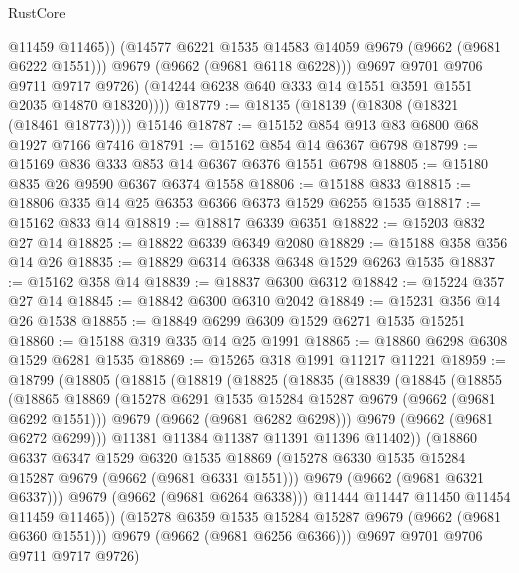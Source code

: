 \begin{lexlean}{RustCore}
\begin{coremodule}
                  @11459
                  @11465))
              (@14577 @6221 @1535 @14583 @14059 @9679 (@9662 (@9681 @6222 @1551)))
              @9679
              (@9662 (@9681 @6118 @6228)))
            @9697
            @9701
            @9706
            @9711
            @9717
            @9726)
          (@14244 @6238 @640 @333 @14 @1551 @3591 @1551 @2035 @14870 @18320))))
@18779 := @18135 (@18139 (@18308 (@18321 (@18461 @18773)))) @15146
@18787 := @15152 @854 @913 @83 @6800 @68 @1927 @7166 @7416
@18791 := @15162 @854 @14 @6367 @6798
@18799 := @15169 @836 @333 @853 @14 @6367 @6376 @1551 @6798
@18805 := @15180 @835 @26 @9590 @6367 @6374 @1558
@18806 := @15188 @833
@18815 := @18806 @335 @14 @25 @6353 @6366 @6373 @1529 @6255 @1535
@18817 := @15162 @833 @14
@18819 := @18817 @6339 @6351
@18822 := @15203 @832 @27 @14
@18825 := @18822 @6339 @6349 @2080
@18829 := @15188 @358 @356 @14 @26
@18835 := @18829 @6314 @6338 @6348 @1529 @6263 @1535
@18837 := @15162 @358 @14
@18839 := @18837 @6300 @6312
@18842 := @15224 @357 @27 @14
@18845 := @18842 @6300 @6310 @2042
@18849 := @15231 @356 @14 @26 @1538
@18855 := @18849 @6299 @6309 @1529 @6271 @1535 @15251
@18860 := @15188 @319 @335 @14 @25 @1991
@18865 := @18860 @6298 @6308 @1529 @6281 @1535
@18869 := @15265 @318 @1991 @11217 @11221
@18959 := @18799
    (@18805
      (@18815
        (@18819
          (@18825
            (@18835
              (@18839
                (@18845
                  (@18855
                    (@18865
                      @18869
                      (@15278 @6291 @1535 @15284 @15287 @9679 (@9662 (@9681 @6292 @1551)))
                      @9679
                      (@9662 (@9681 @6282 @6298)))
                    @9679
                    (@9662 (@9681 @6272 @6299)))
                  @11381
                  @11384
                  @11387
                  @11391
                  @11396
                  @11402))
              (@18860
                @6337
                @6347
                @1529
                @6320
                @1535
                @18869
                (@15278 @6330 @1535 @15284 @15287 @9679 (@9662 (@9681 @6331 @1551)))
                @9679
                (@9662 (@9681 @6321 @6337)))
              @9679
              (@9662 (@9681 @6264 @6338)))
            @11444
            @11447
            @11450
            @11454
            @11459
            @11465))
        (@15278 @6359 @1535 @15284 @15287 @9679 (@9662 (@9681 @6360 @1551)))
        @9679
        (@9662 (@9681 @6256 @6366)))
      @9697
      @9701
      @9706
      @9711
      @9717
      @9726)

\end{coremodule}
\end{lexlean}

